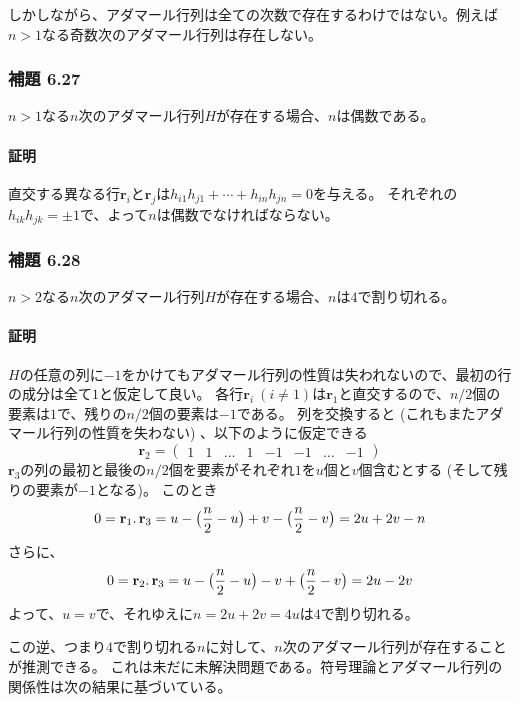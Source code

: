 \documentclass[12pt,a4paper]{article}
\begin{document}
      しかしながら、アダマール行列は全ての次数で存在するわけではない。例えば$n > 1$なる奇数次のアダマール行列は存在しない。

    \subsubsection*{補題 6.27}
      $n > 1$なる$n$次のアダマール行列$H$が存在する場合、$n$は偶数である。

      \paragraph{証明}
        直交する異なる行$\mathbf{r}_i$と$\mathbf{r}_j$は$h_{i1}h_{j1} + \cdots + h_{in}h_{jn} = 0$を与える。
        それぞれの$h_{ik}h_{jk} = \pm1$で、よって$n$は偶数でなければならない。

    \subsubsection*{補題 6.28}
      $n > 2$なる$n$次のアダマール行列$H$が存在する場合、$n$は$4$で割り切れる。

      \paragraph{証明}
        $H$の任意の列に$-1$をかけてもアダマール行列の性質は失われないので、最初の行の成分は全て$1$と仮定して良い。
        各行$\mathbf{r}_i \ (i \neq 1)$は$\mathbf{r}_1$と直交するので、$n/2$個の要素は$1$で、残りの$n/2$個の要素は$-1$である。
        列を交換すると (これもまたアダマール行列の性質を失わない) 、以下のように仮定できる
        \[ \mathbf{r}_2 = \begin{pmatrix} 1 & 1 & \ldots & 1 & -1 & -1 & \ldots & -1 \end{pmatrix} \]
        $\mathbf{r}_3$の列の最初と最後の$n/2$個を要素がそれぞれ$1$を$u$個と$v$個含むとする (そして残りの要素が$-1$となる)。 このとき
        \[0 = \mathbf{r}_1 \ldotp \mathbf{r}_3 = u - \big( \frac n2 - u \big) + v - \big( \frac n2 - v \big) = 2u + 2v - n\]
        さらに、
        \[ 0 = \mathbf{r}_2 \ldotp \mathbf{r}_3 = u - \big( \frac n2 - u \big) - v + \big( \frac n2 - v \big) = 2u - 2v \]
        よって、$u = v$で、それゆえに$n = 2u + 2v = 4u$は$4$で割り切れる。
        
      この逆、つまり$4$で割り切れる$n$に対して、$n$次のアダマール行列が存在することが推測できる。
      これは未だに未解決問題である。符号理論とアダマール行列の関係性は次の結果に基づいている。
\end{document}
